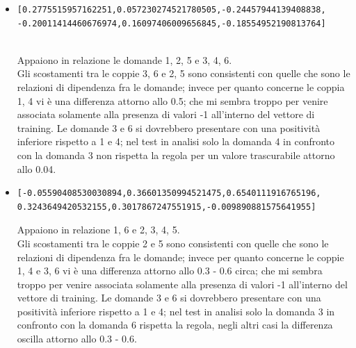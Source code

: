 \begin{itemize}
\item \begin{verbatim}[0.2775515957162251,0.057230274521780505,-0.24457944139408838,
-0.20011414460676974,0.16097406009656845,-0.18554952190813764]\end{verbatim}\\
Appaiono in relazione le domande 1, 2, 5 e 3, 4, 6.\\
Gli scostamenti tra le  coppie 3, 6 e 2, 5 sono consistenti con quelle che sono le relazioni di dipendenza fra le domande; invece per quanto concerne le coppia 1, 4 vi \`e una differenza attorno allo 0.5; che mi sembra troppo per venire associata solamente alla presenza di valori -1 all'interno del vettore di training.
Le domande 3 e 6 si dovrebbero presentare con una positivit\`a inferiore rispetto a 1 e 4; nel test in analisi solo la domanda 4 in confronto con la domanda 3 non rispetta la regola per un valore trascurabile attorno allo 0.04.

\item \begin{verbatim}[-0.05590408530030894,0.36601350994521475,0.6540111916765196,
0.3243649420532155,0.3017867247551915,-0.009890881575641955]\end{verbatim}
Appaiono in relazione 1, 6 e 2, 3, 4, 5.\\
Gli scostamenti tra le coppie 2 e 5 sono consistenti con quelle che sono le relazioni di dipendenza fra le domande; invece per quanto concerne le coppie 1, 4 e 3, 6 vi \`e una differenza attorno allo 0.3 - 0.6 circa; che mi sembra troppo per venire associata solamente alla presenza di valori -1 all'interno del vettore di training.
Le domande 3 e 6 si dovrebbero presentare con una positivit\`a inferiore rispetto a 1 e 4; nel test in analisi solo la domanda 3 in confronto con la domanda 6 rispetta la regola, negli altri casi la differenza oscilla attorno allo 0.3 - 0.6.
\end{itemize}


